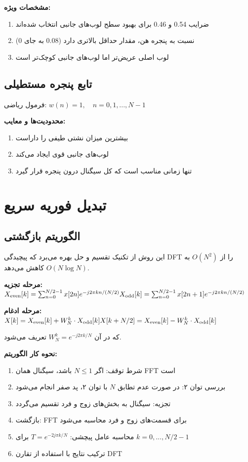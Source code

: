 \documentclass{article}
\begin{document}
\begin{RTL}
\textbf{مشخصات ویژه:}
\begin{enumerate}[label=\alph*)]
\item ضرایب 0.54 و 0.46 برای بهبود سطح لوب‌های جانبی انتخاب شده‌اند
\item نسبت به پنجره هن، مقدار حداقل بالاتری دارد (0.08 به جای 0)
\item لوب اصلی عریض‌تر اما لوب‌های جانبی کوچک‌تر است
\end{enumerate}

\subsection{تابع پنجره مستطیلی }
فرمول ریاضی:
\beginL $
w(n) = 1, \quad n = 0, 1, ..., N-1
$\\ \endL

\textbf{محدودیت‌ها و معایب:}
\begin{enumerate}[label=\alph*)]
\item بیشترین میزان نشتی طیفی را داراست
\item لوب‌های جانبی قوی ایجاد می‌کند
\item تنها زمانی مناسب است که کل سیگنال درون پنجره قرار گیرد
\end{enumerate}

\section{تبدیل فوریه سریع }

\subsection{الگوریتم بازگشتی }
این روش از تکنیک تقسیم و حل بهره می‌برد که پیچیدگی DFT را از $O(N^2)$ به $O(N \log N)$ کاهش می‌دهد.

\textbf{مرحله تجزیه:}
\beginL $
X_\text{even}[k] = \sum_{n=0}^{N/2-1} x[2n] e^{-j2\pi kn/(N/2)} \\
X_\text{odd}[k] = \sum_{n=0}^{N/2-1} x[2n+1] e^{-j2\pi kn/(N/2)}
$\\ \endL

\textbf{مرحله ادغام:}
\beginL $
X[k] = X_\text{even}[k] + W_N^k \cdot X_\text{odd}[k] \\
X[k + N/2] = X_\text{even}[k] - W_N^k \cdot X_\text{odd}[k]
$\\ \endL

که در آن $W_N^k = e^{-j2\pi k/N}$ تعریف می‌شود.

\textbf{نحوه کار الگوریتم:}
\begin{enumerate}[label=\alph*)]
\item شرط توقف: اگر $N \leq 1$ باشد، سیگنال همان FFT است
\item بررسی توان ۲: در صورت عدم تطابق $N$ با توان ۲، پد صفر انجام می‌شود
\item تجزیه: سیگنال به بخش‌های زوج و فرد تقسیم می‌گردد
\item بازگشت: FFT برای قسمت‌های زوج و فرد محاسبه می‌شود
\item محاسبه عامل پیچشی: $T = e^{-2j\pi k/N}$ برای $k = 0, ..., N/2-1$
\item ترکیب نتایج با استفاده از تقارن DFT
\end{enumerate}


\end{RTL}
\end{document}
